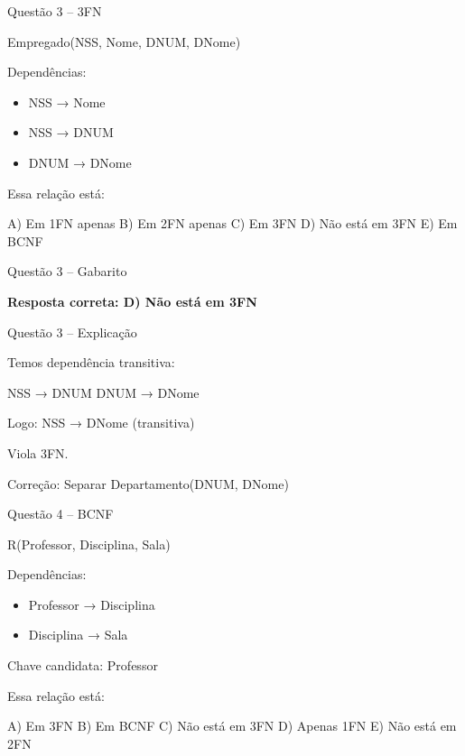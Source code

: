 \documentclass{beamer}
\begin{document}
\begin{frame}{Questão 3 – 3FN}

Empregado(NSS, Nome, DNUM, DNome)

Dependências:
\begin{itemize}
\item NSS → Nome
\item NSS → DNUM
\item DNUM → DNome
\end{itemize}

Essa relação está:

A) Em 1FN apenas  
B) Em 2FN apenas  
C) Em 3FN  
D) Não está em 3FN  
E) Em BCNF  

\end{frame}





\begin{frame}{Questão 3 – Gabarito}

\Large \textbf{Resposta correta: D) Não está em 3FN}

\end{frame}





\begin{frame}{Questão 3 – Explicação}

Temos dependência transitiva:

NSS → DNUM  
DNUM → DNome  

Logo:
NSS → DNome (transitiva)

Viola 3FN.

Correção:
Separar Departamento(DNUM, DNome)

\end{frame}





\begin{frame}{Questão 4 – BCNF}

R(Professor, Disciplina, Sala)

Dependências:
\begin{itemize}
\item Professor → Disciplina
\item Disciplina → Sala
\end{itemize}

Chave candidata:
Professor

Essa relação está:

A) Em 3FN  
B) Em BCNF  
C) Não está em 3FN  
D) Apenas 1FN  
E) Não está em 2FN  

\end{frame}
\end{document}
